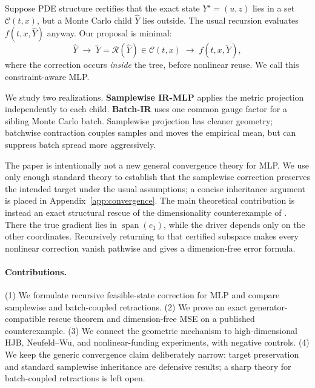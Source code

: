 \documentclass{article}
\begin{document}
Suppose PDE structure certifies that the exact state $Y^\star=(u,z)$ lies in a set $\mathcal C(t,x)$, but a Monte Carlo child $\widehat Y$ lies outside. The usual recursion evaluates $f(t,x,\widehat Y)$ anyway. Our proposal is minimal:
\begin{equation}
\widehat Y \;\longrightarrow\; \widetilde Y=\mathcal R(\widehat Y)\in\mathcal C(t,x)
\;\longrightarrow\; f(t,x,\widetilde Y),
\label{eq:principle}
\end{equation}
where the correction occurs \emph{inside} the tree, before nonlinear reuse. We call this constraint-aware MLP.

We study two realizations. \textbf{Samplewise IR-MLP} applies the metric projection independently to each child. \textbf{Batch-IR} uses one common gauge factor for a sibling Monte Carlo batch. Samplewise projection has cleaner geometry; batchwise contraction couples samples and moves the empirical mean, but can suppress batch spread more aggressively.

The paper is intentionally not a new general convergence theory for MLP. We use only enough standard theory to establish that the samplewise correction preserves the intended target under the usual assumptions; a concise inheritance argument is placed in Appendix~\ref{app:convergence}. The main theoretical contribution is instead an exact structural rescue of the dimensionality counterexample of \citet{HutzenthalerNguyen2025}. There the true gradient lies in $\operatorname{span}(e_1)$, while the driver depends only on the other coordinates. Recursively returning to that certified subspace makes every nonlinear correction vanish pathwise and gives a dimension-free error formula.

\paragraph{Contributions.}
(1) We formulate recursive feasible-state correction for MLP and compare samplewise and batch-coupled retractions. (2) We prove an exact generator-compatible rescue theorem and dimension-free MSE on a published counterexample. (3) We connect the geometric mechanism to high-dimensional HJB, Neufeld--Wu, and nonlinear-funding experiments, with negative controls. (4) We keep the generic convergence claim deliberately narrow: target preservation and standard samplewise inheritance are defensive results; a sharp theory for batch-coupled retractions is left open.
\end{document}

